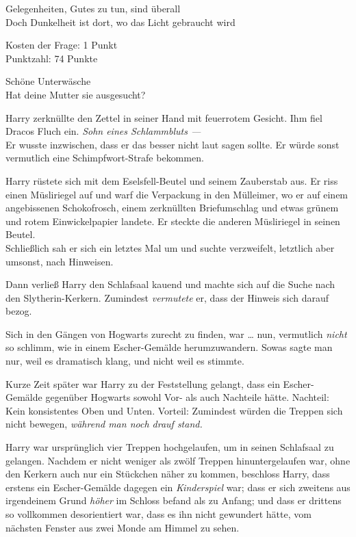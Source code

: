 {Gelegenheiten, Gutes zu tun, sind überall\\ Doch Dunkelheit ist dort, wo das Licht gebraucht wird

Kosten der Frage: 1 Punkt\\ Punktzahl: 74 Punkte

Schöne Unterwäsche\\ Hat deine Mutter sie ausgesucht?

Harry zerknüllte den Zettel in seiner Hand mit feuerrotem Gesicht. Ihm fiel Dracos Fluch ein. \emph{Sohn eines Schlammbluts ---}\\ Er wusste inzwischen, dass er das besser nicht laut sagen sollte. Er würde sonst vermutlich eine Schimpfwort-Strafe bekommen.

Harry rüstete sich mit dem Eselsfell-Beutel und seinem Zauberstab aus. Er riss einen Müsliriegel auf und warf die Verpackung in den Mülleimer, wo er auf einem angebissenen Schokofrosch, einem zerknüllten Briefumschlag und etwas grünem und rotem Einwickelpapier landete. Er steckte die anderen Müsliriegel in seinen Beutel.\\ Schließlich sah er sich ein letztes Mal um und suchte verzweifelt, letztlich aber umsonst, nach Hinweisen.

Dann verließ Harry den Schlafsaal kauend und machte sich auf die Suche nach den Slytherin-Kerkern. Zumindest \emph{vermutete} er, dass der Hinweis sich darauf bezog.

Sich in den Gängen von Hogwarts zurecht zu finden, war … nun, vermutlich \emph{nicht} so schlimm, wie in einem Escher-Gemälde herumzuwandern. Sowas sagte man nur, weil es dramatisch klang, und nicht weil es stimmte.

Kurze Zeit später war Harry zu der Feststellung gelangt, dass ein Escher-Gemälde gegenüber Hogwarts sowohl Vor- als auch Nachteile hätte. Nachteil: Kein konsistentes Oben und Unten. Vorteil: Zumindest würden die Treppen sich nicht bewegen, \emph{während man noch drauf stand.}

Harry war ursprünglich vier Treppen hochgelaufen, um in seinen Schlafsaal zu gelangen. Nachdem er nicht weniger als zwölf Treppen hinuntergelaufen war, ohne den Kerkern auch nur ein Stückchen näher zu kommen, beschloss Harry, dass erstens ein Escher-Gemälde dagegen ein \emph{Kinderspiel} war; dass er sich zweitens aus irgendeinem Grund \emph{höher} im Schloss befand als zu Anfang; und dass er drittens so vollkommen desorientiert war, dass es ihn nicht gewundert hätte, vom nächsten Fenster aus zwei Monde am Himmel zu sehen.

}
